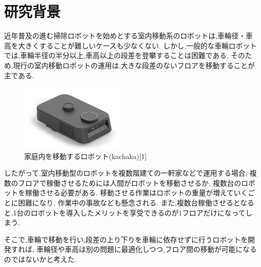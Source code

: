 \documentclass[dvipdfmx]{jsarticle}
\begin{document}

\section{研究背景}
近年普及の進む掃除ロボットを始めとする室内移動系のロボットは,車輪径・車高を大きくすることが難しいケースも少なくない.
しかし,一般的な車輪ロボットでは,車輪半径の半分以上,車高以上の段差を登攀することは困難である.
そのため,現行の室内移動ロボットの運用は,大きな段差のないフロアを移動することが主である.
\begin{figure}[H]
  \centering
  \includegraphics[width=50mm]{image/mn0201_kachaka_006}
  \caption{家庭内を移動するロボット(kachaka)[1]}
  
  \label{fig:runba}
\end{figure}
したがって,室内移動型のロボットを複数階建ての一軒家などで運用する場合,
複数のフロアで稼働させるためには人間がロボットを移動させるか,
複数台のロボットを稼働させる必要がある.
移動させる作業はロボットの重量が増えていくごとに困難になり,
作業中の事故なども懸念される.
また,複数台稼働させるとなると,1台のロボットを導入したメリットを享受できるのが1フロアだけになってしまう.

そこで,車輪で移動を行い,段差の上り下りを車輪に依存せずに行うロボットを開発すれば,
車輪径や車高は別の問題に最適化しつつ,フロア間の移動が可能になるのではないかと考えた.
\end{document}
